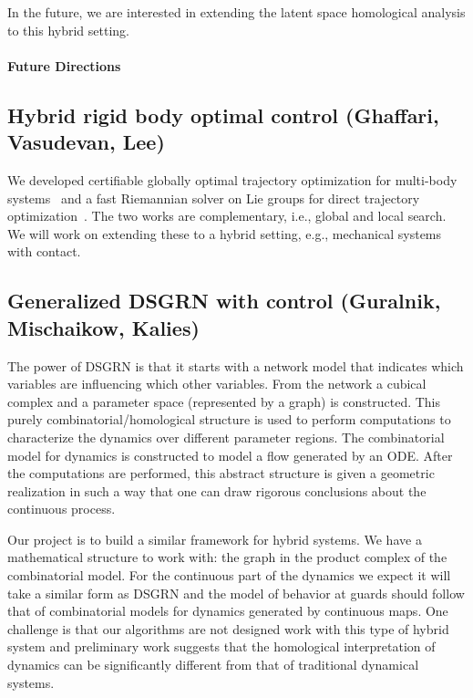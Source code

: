 \documentclass[letterpaper,11pt]{article}
\begin{document}
In the future, we are interested in extending the latent space homological analysis to this hybrid setting. 

\paragraph*{Future Directions}
\subsection{Hybrid rigid body optimal control (Ghaffari, Vasudevan, Lee)}
We developed certifiable globally optimal trajectory optimization for multi-body systems~\cite{teng2024convex} and a fast Riemannian solver on Lie groups for direct trajectory optimization~\cite{teng2025riemannian}. The two works are complementary, i.e., global and local search. We will work on extending these to a hybrid setting, e.g., mechanical systems with contact.

\subsection{Generalized DSGRN with control (Guralnik, Mischaikow, Kalies)}
%
The power of DSGRN is that it starts with a network model that indicates which variables are influencing which other variables.
%
From the network a cubical complex and a parameter space (represented by a graph) is constructed.
%
This purely combinatorial/homological structure is used to perform computations to characterize the dynamics over different parameter regions.
%
The combinatorial model for dynamics is constructed to model a flow generated by an ODE.
%
After the computations are performed, this abstract structure is given a geometric realization in such a way that one can draw rigorous conclusions about the continuous process.
%

Our project is to build a similar framework for hybrid systems.
%
We have a mathematical structure to work with: the graph in the product complex of the combinatorial model.
%
For the continuous part of the dynamics we expect it will take a similar form as DSGRN and 
%
the model of behavior at guards should follow that of combinatorial models for dynamics generated by continuous maps.
%
One challenge is that our algorithms are not designed work with this type of hybrid system and preliminary work suggests that the homological interpretation of dynamics can be significantly different from that of traditional dynamical systems.
%
\end{document}
